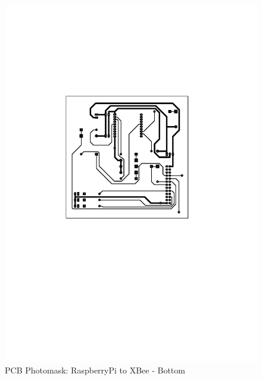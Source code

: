 \begin{figure}[H]
\begin{center}
\includegraphics{figures/Pi2XBee_bottom}
\end{center}
\caption{PCB Photomask: RaspberryPi to XBee - Bottom}
\label{fig:Pi2XBee2}
\end{figure}
